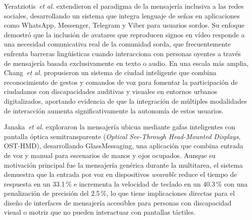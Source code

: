\documentclass[journal]{IEEEtran}
\begin{document}
	Yeratziotis~\textit{et al.} \cite{yeratziotis2023} extendieron el paradigma de la mensajer\'ia inclusiva a las redes sociales, desarrollando un sistema que integra lenguaje de se\~nas en aplicaciones como WhatsApp, Messenger, Telegram y Viber para usuarios sordos. Su enfoque demostr\'o que la inclusi\'on de avatares que reproducen signos en v\'ideo responde a una necesidad comunicativa real de la comunidad sorda, que frecuentemente enfrenta barreras ling\"u\'isticas cuando interacciona con personas oyentes a trav\'es de mensajer\'ia basada exclusivamente en texto o audio. En una escala m\'as amplia, Chang~\textit{et al.} \cite{chang2022} propusieron un sistema de ciudad inteligente que combina reconocimiento de gestos y comandos de voz para fomentar la participaci\'on de ciudadanos con discapacidades auditivas y visuales en entornos urbanos digitalizados, aportando evidencia de que la integraci\'on de m\'ultiples modalidades de interacci\'on aumenta significativamente la autonom\'ia de estos usuarios.
	
	Janaka~\textit{et al.} \cite{janaka2023} exploraron la mensajer\'ia ubicua mediante gafas inteligentes con pantalla \'optica semitransparente (\textit{Optical See-Through Head-Mounted Displays}, OST-HMD), desarrollando GlassMessaging, una aplicaci\'on que combina entrada de voz y manual para escenarios de manos y ojos ocupados. Aunque su motivaci\'on principal fue la mensajer\'ia gen\'erica durante la multitarea, el sistema demuestra que la entrada por voz en dispositivos \textit{wearable} reduce el tiempo de respuesta en un 33.1\,\% e incrementa la velocidad de teclado en un 40.3\,\% con una penalizaci\'on de precisi\'on del 2.5\,\%, lo que tiene implicaciones directas para el dise\~no de interfaces de mensajer\'ia accesibles para personas con discapacidad visual o motriz que no pueden interactuar con pantallas t\'actiles.
	
\end{document}
